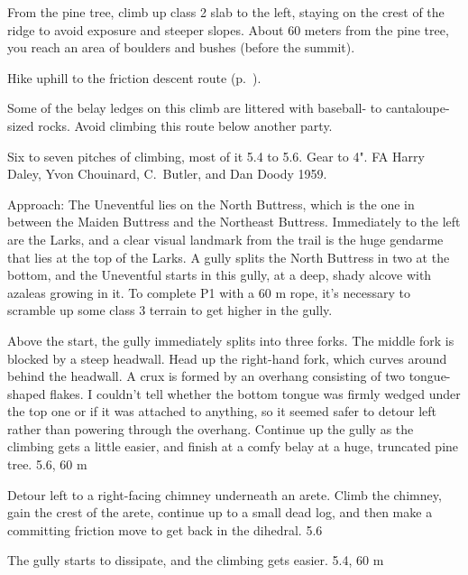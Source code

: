 \documentclass{tahquitz}
\begin{document}
From the pine tree, climb up class 2 slab to the left, staying on
the crest of the ridge to avoid exposure and steeper slopes. About 60
meters from the pine tree, you reach an area of boulders and bushes
(before the summit).

Hike uphill to the friction descent route (p.~\pageref{subsec:friction-descent}).





Some of the belay ledges on this climb
are littered with baseball- to cantaloupe-sized rocks.
Avoid climbing this route below
another party.

Six to seven pitches of climbing, most of it 5.4 to 5.6. Gear to 4".
FA Harry Daley, Yvon Chouinard, C.~Butler, and Dan Doody 1959.

Approach: The Uneventful lies on the North Buttress, which is the one
in between the Maiden Buttress and the Northeast Buttress. Immediately
to the left are the Larks, and a clear visual landmark from the trail
is the huge gendarme that lies at the top of the Larks. A gully
splits the North Buttress in two at the bottom, and the Uneventful starts in this gully,
at a deep, shady alcove with azaleas
growing in it.
To complete P1 with a 60 m rope, it's necessary to scramble up some
class 3 terrain to get higher in the gully.

 Above the start, the gully immediately splits into three
forks. The middle fork is blocked by a steep headwall.
Head up the right-hand fork, which curves around behind
the headwall. A crux is formed by an overhang consisting 
of two tongue-shaped flakes.
I couldn't tell whether the bottom tongue was firmly wedged under the top
one or if it was attached to anything, so it seemed safer to detour left
rather than powering through the overhang. Continue up the gully as the
climbing gets a little easier, and finish at a comfy belay at a huge,
truncated pine tree. 5.6, 60 m

  Detour left to a right-facing chimney underneath an arete.
Climb the chimney, gain the crest of the arete, continue up
to a small dead log, and then make a committing friction
move to get back in the dihedral. 5.6

 The gully starts to dissipate, and the climbing gets easier.
5.4, 60 m
\end{document}
